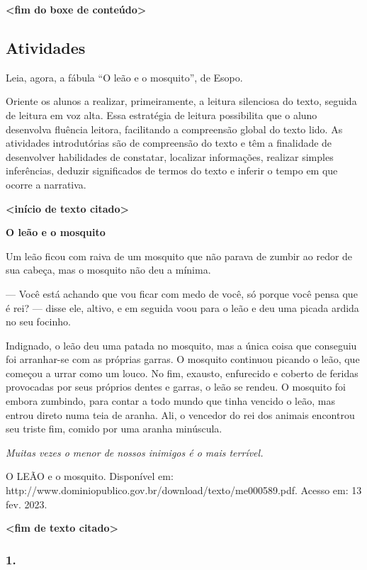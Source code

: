 \textbf{\textless{}fim do boxe de conteúdo\textgreater{}}

\subsection{Atividades}\label{atividades}

Leia, agora, a fábula ``O leão e o mosquito'', de Esopo.

Oriente os alunos a realizar, primeiramente, a leitura silenciosa do
texto, seguida de leitura em voz alta. Essa estratégia de leitura
possibilita que o aluno desenvolva fluência leitora, facilitando a
compreensão global do texto lido. As atividades introdutórias são de
compreensão do texto e têm a finalidade de desenvolver habilidades de
constatar, localizar informações, realizar simples inferências, deduzir
significados de termos do texto e inferir o tempo em que ocorre a
narrativa.

\textbf{\textless{}início de texto citado\textgreater{}}

\textbf{O leão e o mosquito}

Um leão ficou com raiva de um mosquito que não parava de zumbir ao redor
de sua cabeça, mas o mosquito não deu a mínima.

--- Você está achando que vou ficar com medo de você, só porque você
pensa que é rei? --- disse ele, altivo, e em seguida voou para o leão e
deu uma picada ardida no seu focinho.

Indignado, o leão deu uma patada no mosquito, mas a única coisa que
conseguiu foi arranhar-se com as próprias garras. O mosquito continuou
picando o leão, que começou a urrar como um louco.
\protect\hypertarget{_Hlk127196779}{}{}No fim, exausto, enfurecido e
coberto de feridas provocadas por seus próprios dentes e garras, o leão
se rendeu. O mosquito foi embora zumbindo, para contar a todo mundo que
tinha vencido o leão, mas entrou direto numa teia de aranha. Ali, o
vencedor do rei dos animais encontrou seu triste fim, comido por uma
aranha minúscula.

\emph{Muitas vezes o menor de nossos inimigos é o mais terrível.}

O LEÃO e o mosquito. Disponível em:
http://www.dominiopublico.gov.br/download/texto/me000589.pdf. Acesso em:
13 fev. 2023.

\textbf{\textless{}fim de texto citado\textgreater{}}

\subsubsection{1. }\label{section}

